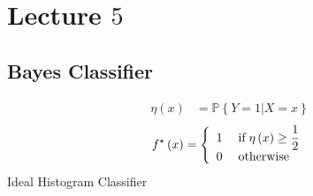 \documentclass{article}
\begin{document}
\section{Lecture $5$} 


\subsection{Bayes Classifier}
\begin{align*}
\eta\left(x\right) &= \mathbb{P}\left\{Y = 1 | X = x \right\}
\end{align*}
\[ f^\star \left(x\right) =\left\{ \begin{array}{ll}
1& \text{\;if\;} \eta\left(x\right) \geq  \dfrac{1}{2} \\
0& \text{\;otherwise\;} \\
\end{array}\right. \]
Ideal Histogram Classifier
\end{document}
